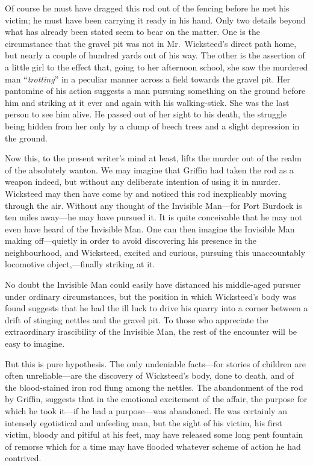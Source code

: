Of course he must have dragged this rod out of the fencing before he met his victim; he must have been carrying it ready in his hand. Only two details beyond what has already been stated seem to bear on the matter. One is the circumstance that the gravel pit was not in Mr.\ Wicksteed’s direct path home, but nearly a couple of hundred yards out of his way. The other is the assertion of a little girl to the effect that, going to her afternoon school, she saw the murdered man “\emph{trotting}” in a peculiar manner across a field towards the gravel pit. Her pantomine of his action suggests a man pursuing something on the ground before him and striking at it ever and again with his walking-stick. She was the last person to see him alive. He passed out of her sight to his death, the struggle being hidden from her only by a clump of beech trees and a slight depression in the ground.

Now this, to the present writer’s mind at least, lifts the murder out of the realm of the absolutely wanton. We may imagine that Griffin had taken the rod as a weapon indeed, but without any deliberate intention of using it in murder. Wicksteed may then have come by and noticed this rod inexplicably moving through the air. Without any thought of the Invisible Man—for Port Burdock is ten miles away—he may have pursued it. It is quite conceivable that he may not even have heard of the Invisible Man. One can then imagine the Invisible Man making off—quietly in order to avoid discovering his presence in the neighbourhood, and Wicksteed, excited and curious, pursuing this unaccountably locomotive object,—finally striking at it.

No doubt the Invisible Man could easily have distanced his middle-aged pursuer under ordinary circumstances, but the position in which Wicksteed’s body was found suggests that he had the ill luck to drive his quarry into a corner between a drift of stinging nettles and the gravel pit. To those who appreciate the extraordinary irascibility of the Invisible Man, the rest of the encounter will be easy to imagine.

But this is pure hypothesis. The only undeniable facts—for stories of children are often unreliable—are the discovery of Wicksteed’s body, done to death, and of the blood-stained iron rod flung among the nettles. The abandonment of the rod by Griffin, suggests that in the emotional excitement of the affair, the purpose for which he took it—if he had a purpose—was abandoned. He was certainly an intensely egotistical and unfeeling man, but the sight of his victim, his first victim, bloody and pitiful at his feet, may have released some long pent fountain of remorse which for a time may have flooded whatever scheme of action he had contrived.

